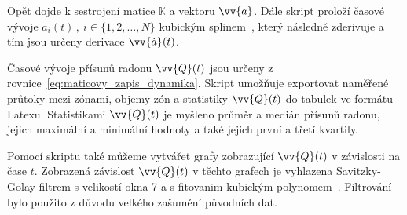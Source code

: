 Opět dojde k sestrojení matice $\mathbb{K}$ a vektoru $\vv{a}$. Dále skript proloží časové vývoje $a_i(t)\,,\ i\in\{1,2,\dots,N\}$ kubickým splinem~\cite{spline}, který následně zderivuje a tím jsou určeny derivace $\vv{\dot{a}}(t)$.

Časové vývoje přísunů radonu $\vv{Q}(t)$ jsou určeny z rovnice~\eqref{eq:maticovy_zapis_dynamika}. Skript umožňuje exportovat naměřené průtoky mezi zónami, objemy zón a statistiky $\vv{Q}(t)$ do tabulek ve formátu Latexu. Statistikami $\vv{Q}(t)$ je myšleno průměr a medián přísunů radonu, jejich maximální a minimální hodnoty a také jejich první a třetí kvartily. 

Pomocí skriptu také můžeme vytvářet grafy zobrazující $\vv{Q}(t)$ v závislosti na čase $t$. Zobrazená závislost  $\vv{Q}(t)$ v těchto grafech je vyhlazena Savitzky-Golay filtrem s velikostí okna 7 a s fitovanim kubickým polynomem~\cite{savgol}. Filtrování bylo použito z důvodu velkého zašumění původních dat. 
